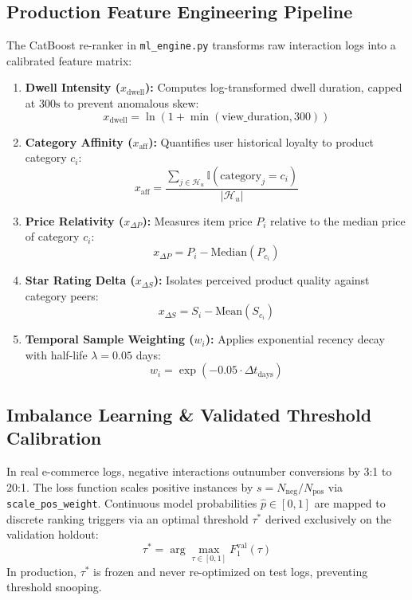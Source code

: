 \documentclass[11pt,a4paper]{article}
\begin{document}
\subsection{Production Feature Engineering Pipeline}
The CatBoost re-ranker in \texttt{ml\_engine.py} transforms raw interaction logs into a calibrated feature matrix:
\begin{enumerate}
    \item \textbf{Dwell Intensity ($x_{\text{dwell}}$):} Computes log-transformed dwell duration, capped at $300\text{s}$ to prevent anomalous skew:
    \begin{equation}
        x_{\text{dwell}} = \ln(1 + \min(\text{view\_duration}, 300))
    \end{equation}
    \item \textbf{Category Affinity ($x_{\text{aff}}$):} Quantifies user historical loyalty to product category $c_i$:
    \begin{equation}
        x_{\text{aff}} = \frac{\sum_{j \in \mathcal{H}_u} \mathbb{I}(\text{category}_j = c_i)}{|\mathcal{H}_u|}
    \end{equation}
    \item \textbf{Price Relativity ($x_{\Delta P}$):} Measures item price $P_i$ relative to the median price of category $c_i$:
    \begin{equation}
        x_{\Delta P} = P_i - \text{Median}(P_{c_i})
    \end{equation}
    \item \textbf{Star Rating Delta ($x_{\Delta S}$):} Isolates perceived product quality against category peers:
    \begin{equation}
        x_{\Delta S} = S_i - \text{Mean}(S_{c_i})
    \end{equation}
    \item \textbf{Temporal Sample Weighting ($w_i$):} Applies exponential recency decay with half-life $\lambda = 0.05$ days:
    \begin{equation}
        w_i = \exp\left(-0.05 \cdot \Delta t_{\text{days}}\right)
    \end{equation}
\end{enumerate}

\subsection{Imbalance Learning \& Validated Threshold Calibration}
In real e-commerce logs, negative interactions outnumber conversions by 3:1 to 20:1. The loss function scales positive instances by $s = N_{\text{neg}} / N_{\text{pos}}$ via \texttt{scale\_pos\_weight}. Continuous model probabilities $\hat{p} \in [0, 1]$ are mapped to discrete ranking triggers via an optimal threshold $\tau^*$ derived exclusively on the validation holdout:
\begin{equation}
    \tau^* = \arg\max_{\tau \in [0, 1]} F_1^{\text{val}}(\tau)
\end{equation}
In production, $\tau^*$ is frozen and never re-optimized on test logs, preventing threshold snooping.
\end{document}
